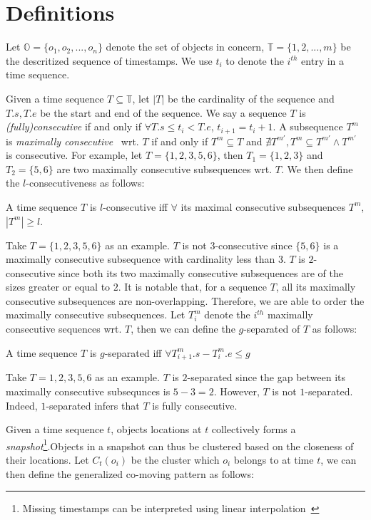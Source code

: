 \section{Definitions}
\label{sec:definition}
Let $\mathbb{O} = \{o_1 ,o_2,...,o_n\}$ denote the set of objects in concern, $\mathbb{T} = \{1,2,...,m\}$ be the descritized sequence of timestamps. We use $t_i$ to denote the $i^{th}$ entry in a time sequence.


Given a time sequence $T \subseteq \mathbb{T}$, let $|T|$ be the cardinality of the sequence and $T.s,T.e$ be the start and end of the sequence. We say a sequence $T$ is \emph{(fully)consecutive}
if and only if $\forall T.s \leq t_i < T.e$, $t_{i+1} = t_i + 1$. A subsequence $T^m$ is \emph{maximally consecutive}~\cite{li2015platoon} wrt. $T$ if and only if $T^m \subseteq T$ and $\nexists T^{m'}, T^m \subseteq T^{m'} \wedge T^{m'} $ is consecutive. For example, let $T=\{1,2,3,5,6\}$, then $T_1=\{1,2,3\}$ and $T_2=\{5,6\}$ are two maximally consecutive subsequences wrt. $T$. We then define the $l$-consecutiveness as follows:

\begin{definition}[$l$-consecutive]
A time sequence $T$ is $l$-consecutive iff $\forall$ its maximal consecutive subsequences $T^m$, $|T^m| \geq l$.
\end{definition}

Take $T=\{1,2,3,5,6\}$ as an example. $T$ is not $3$-consecutive since $\{5,6\}$ is a maximally consecutive subsequence with cardinality less than $3$. $T$ is $2$-consecutive since both its two maximally consecutive subsequences are of the sizes greater or equal to $2$. It is notable that, for a sequence $T$, all its maximally consecutive subsequences are non-overlapping. Therefore, we are able to order the maximally consecutive subsequences. Let $T^m_{i}$ denote the $i^{th}$ maximally consecutive sequences wrt. $T$, then we can define the $g$-separated of $T$ as follows:

\begin{definition}[$g$-separated]
A time sequence $T$ is $g$-separated iff $\forall T^m_{i+1}.s - T^m_{i}.e \leq g$
\end{definition}

Take $T={1,2,3,5,6}$ as an example. $T$ is $2$-separated since the gap between its maximally consecutive subsequnces is $5-3=2$. However, $T$ is not $1$-separated. Indeed, $1$-separated infers that $T$ is fully consecutive.


Given a time sequence $t$, objects locations at $t$ collectively forms a \emph{snapshot}\footnote{Missing timestamps can be interpreted using linear interpolation~\cite{jeung2008convoy}}.Objects in a snapshot can thus be clustered based on the
closeness of their locations. Let $C_t(o_i)$ be the cluster which $o_i$ belongs to at time $t$, we can then define the generalized co-moving pattern as follows:

